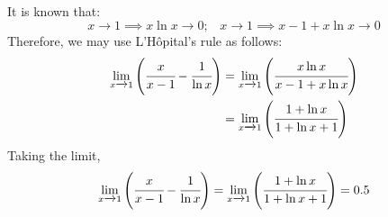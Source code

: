 \documentclass{article}
\begin{document}
It is known that:
$$x \xrightarrow{} 1 \implies x \ln x \xrightarrow{} 0; \;\;\; x \xrightarrow{} 1 \implies x-1 + x\ln x \xrightarrow{} 0$$
Therefore, we may use L'Hôpital's rule as follows:
\begin{align*}
    \displaystyle\lim_{x \xrightarrow{} 1} \left(\cfrac{x}{x-1}-\cfrac{1}{\ln x}\right) 
    &= \displaystyle\lim_{x \xrightarrow{} 1} \left(\cfrac{x \ln x}{x-1 + x\ln x}\right) \\
    &= \displaystyle\lim_{x \xrightarrow{} 1} \left(\cfrac{1 + \ln x}{1+ \ln x + 1}\right) \\
\end{align*}
Taking the limit,
$$\displaystyle\lim_{x \xrightarrow{} 1} \left(\cfrac{x}{x-1}-\cfrac{1}{\ln x}\right)  = \displaystyle\lim_{x \xrightarrow{} 1} \left(\cfrac{1 + \ln x}{1+ \ln x + 1}\right) = 0.5$$

\newpage
\end{document}
